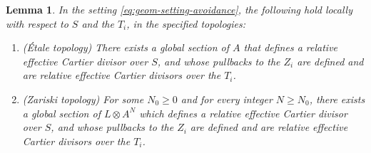 \documentclass[JEP,XML,SOM,Unicode,published]{cedram}
\theoremstyle{plain}
\newtheorem{lemma}[theorem]{Lemma}
\theoremstyle{definition}
\begin{document}
\begin{lemma}\label{lemma:prime-avoidance-families}
In the setting \eqref{eq:geom-setting-avoidance}, the following hold locally with respect to $S$ and the $T_{i}$, in the specified topologies:
\begin{enumerate}
\item\label{item:prime-avoidance-families-1} (Étale topology) There exists a global section of $A$ that defines a relative effective Cartier divisor over $S$, and whose pullbacks to the $Z_{i}$ are defined and are relative effective Cartier divisors over the $T_{i}$.
\item\label{item:prime-avoidance-families-2} (Zariski topology) For some $N_{0}\geq 0$ and for every integer $N\geq N_{0}$, there exists a global section of $L\otimes A^{N}$ which defines a relative effective Cartier divisor over $S$, and whose pullbacks to the $Z_{i}$ are defined and are relative effective Cartier divisors over the $T_{i}$.
\end{enumerate}

\end{lemma}
\end{document}

